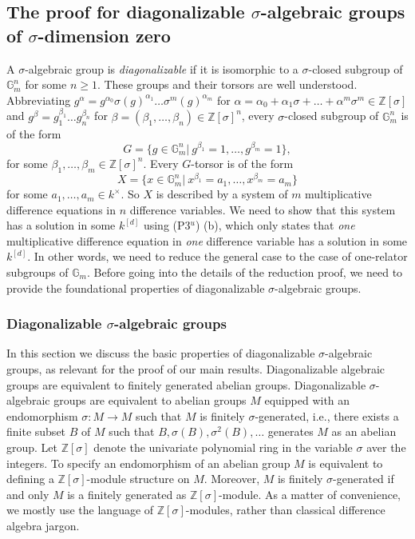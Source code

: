 \documentclass[oneside,reqno]{amsart}
\theoremstyle{definition}
\newcommand{\s}{\sigma}
\newcommand{\Gm}{\mathbb{G}_m}
\newcommand{\ZZ}{\mathbb{Z}}
\newcommand{\pt}{{\rm{(P3$^u$)}}}
\begin{document}
\subsection{The proof for diagonalizable $\s$-algebraic groups of $\s$-dimension zero}

A $\s$-algebraic group is \emph{diagonalizable} if it is isomorphic to a $\s$-closed subgroup of $\Gm^n$ for some $n\geq 1$. These groups and their torsors are well understood. Abbreviating $g^\alpha=g^{\alpha_0}\s(g)^{\alpha_1}\ldots\s^m(g)^{\alpha_m}$ for  $\alpha=\alpha_0+\alpha_1\s+\ldots+\alpha^m\s^m\in \ZZ[\s]$ and $g^\beta=g_1^{\beta_1}\ldots g_n^{\beta_n}$ for $\beta=(\beta_1,\ldots,\beta_n) \in \ZZ[\s]^n$, every $\s$-closed subgroup of $\Gm^n$ is of the form
$$G=\{g\in\Gm^n|\ g^{\beta_1}=1,\ldots,g^{\beta_m}=1 \},$$
for some $\beta_1,\ldots,\beta_m\in\ZZ[\s]^n$. Every $G$-torsor is of the form $$X=\{x\in\Gm^n |\ x^{\beta_1}=a_1,\ldots,x^{\beta_m}=a_m\}$$ for some $a_1,\ldots,a_m\in k^\times$. So $X$ is described by a system of $m$ multiplicative difference equations in $n$ difference variables. We need to show that this system has a solution in some $k^{[d]}$ using \pt{} (b), which only states that \emph{one} multiplicative difference equation in \emph{one} difference variable has a solution in some $k^{[d]}$. In other words, we need to reduce the general case to the case of one-relator subgroups of $\Gm$. Before going into the details of the reduction proof, we need to provide the foundational properties of diagonalizable $\s$-algebraic groups.




\subsubsection{Diagonalizable $\s$-algebraic groups}

In this section we discuss the basic properties of diagonalizable $\s$-algebraic groups, as relevant for the proof of our main results.
Diagonalizable algebraic groups are equivalent to finitely generated abelian groups. Diagonalizable $\s$-algebraic groups are equivalent to abelian groups $M$ equipped with an endomorphism $\s\colon M\to M$ such that $M$ is finitely $\s$-generated, i.e., there exists a finite subset $B$ of $M$ such that $B,\s(B),\s^2(B),\ldots$ generates $M$ as an abelian group. Let $\ZZ[\s]$ denote the univariate polynomial ring in the variable $\s$ aver the integers. To specify an endomorphism of an abelian group $M$ is equivalent to defining a $\ZZ[\s]$-module structure on $M$. Moreover, $M$ is finitely $\s$-generated if and only $M$ is a finitely generated as $\ZZ[\s]$-module. As a matter of convenience, we mostly use the language of $\ZZ[\s]$-modules, rather than classical difference algebra jargon.
\end{document}
